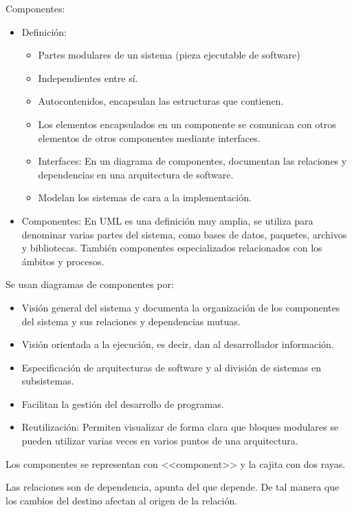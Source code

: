\documentclass[12pt, twoside, openright]{report} %
\begin{document}
Componentes:
\begin{itemize} 
    \item Definición:
		\begin{itemize}
			\item Partes modulares de un sistema (pieza ejecutable de software)
			\item Independientes entre sí.
			\item Autocontenidos, encapsulan las estructuras que contienen.
			\item Los elementos encapsulados en un componente se comunican con
				otros elementos de otros componentes mediante interfaces.
			\item Interfaces: En un diagrama de componentes, documentan las
				relaciones y dependencias en una arquitectura de software.
			\item Modelan los sistemas de cara a la implementación.
      	\end{itemize}
    \item Componentes: En UML es una definición muy amplia, se utiliza para
      denominar varias partes del sistema, como bases de datos,
      paquetes, archivos y bibliotecas. También componentes
      especializados relacionados con los ámbitos y procesos.
\end{itemize}

Se usan diagramas de componentes por:
\begin{itemize} 
    \item Visión general del sistema y documenta la organización de los
      componentes del sistema y sus relaciones y dependencias mutuas.
    \item Visión orientada a la ejecución, es decir, dan al desarrollador
      información.
    \item Especificación de arquitecturas de software y al división de
      sistemas en subsistemas.
    \item Facilitan la gestión del desarrollo de programas.
    \item Reutilización: Permiten visualizar de forma clara que bloques
      modulares se pueden utilizar varias veces en varios puntos de una
      arquitectura.
\end{itemize}

Los componentes se representan con <<component>> y la
cajita con dos rayas.


Las relaciones son de dependencia, apunta del que depende. De tal
manera que los cambios del destino afectan al origen de la relación.
\end{document}
